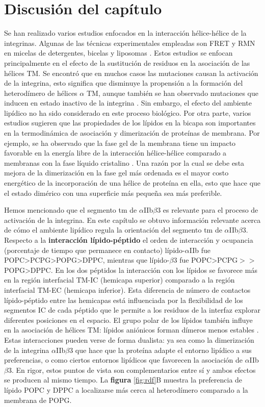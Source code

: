 \section{Discusión del capítulo}

	Se han realizado varios estudios enfocados en la interacción hélice-hélice de la integrinas. Algunas de las técnicas experimentales empleadas son FRET y RMN en micelas de detergentes, bicelas y liposomas \citep{Mineev2014, Merzlyakov2006}. Estos estudios se enfocan principalmente en el efecto de la sustitución de residuos en la asociación de las hélices TM. Se encontró que en muchos casos las mutaciones causan la activación de la integrina, esto significa que disminuye la propensión a la formación del heterodímero de hélices $\alpha$ TM, aunque también se han observado mutaciones que inducen en estado inactivo de la integrina \citep{Lau2009}. Sin embargo, el efecto del ambiente lipídico no ha sido considerado en este proceso biológico. Por otra parte, varios estudios sugieren que las propiedades de los lípidos en la bicapa son importantes en la termodinámica de asociación y dimerización de proteínas de membrana. Por ejemplo, se ha observado que la fase gel de la membrana tiene un impacto favorable en la energía libre de la interacción hélice-hélice comparado a membranas con la fase líquido cristalino \citep{Anbazhagan2010}. Una razón por la cual se debe esta mejora de la dimerización en la fase gel más ordenada es el mayor costo energético de la incorporación de una hélice de proteína en ella, esto que hace que el estado dimérico con una superficie más pequeña sea más preferible.

	Hemos mencionado que el segmento \ac{tm} de $\alpha$IIb$\beta$3 es relevante para el proceso de activación de la integrina. En este capítulo se obtuvo información relevante acerca de cómo el ambiente lipídico regula la orientación del segmento \ac{tm} de $\alpha$IIb$\beta$3. Respecto a la \textbf{interacción lípido-péptido} el orden de interacción y ocupancia (porcentaje de tiempo que permanece en contacto) lípido-$\alpha$IIb fue POPC>PCPG>POPG>DPPC, mientras que lípido-$\beta$3 fue POPC>PCPG\(>\!\!>\)POPG>DPPC. En los dos péptidos la interacción con los lípidos se favorece más en la región interfacial TM-IC (hemicapa superior) comparado a la región interfacial TM-EC (hemicapa inferior). Esta diferencia de número de contactos lípido-péptido entre las hemicapas está influenciada por la flexibilidad de los segmentos IC de cada péptido que le permite a los residuos de la interfaz explorar diferentes posiciones en el espacio.	
	El grupo polar de los lípidos también influye en la asociación de hélices TM: lípidos aniónicos forman dímeros menos estables \citep{Hong2011}. Estas interacciones pueden verse de forma dualista: ya sea como la dimerización de la integrina $\alpha$IIb$\beta$3 que hace que la proteína adapte el entorno lipídico a sus preferencias, o como ciertos entornos lipídicos que favorecen la asociación de $\alpha$IIb$\beta$3. En rigor, estos puntos de vista son complementarios entre sí y ambos efectos se producen al mismo tiempo. La \textbf{figura} \ref{fig:rdf}B muestra la preferencia de lípido POPC y DPPC a localizarse más cerca al heterodímero comparado a la membrana de POPG.
		
